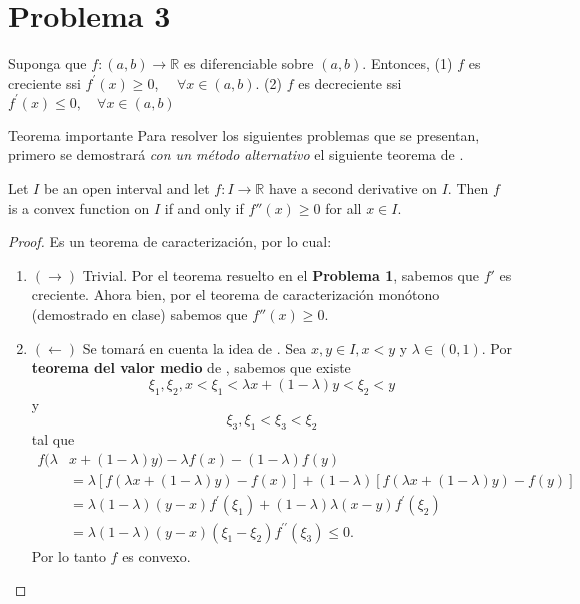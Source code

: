 \section{Problema 3}
\begin{tcolorbox}[colback=gray!15,colframe=gray!1!gray,title=Teorema caracterización monótono (demostrado en clase)]
	Suponga que $f:(a, b) \rightarrow \mathbb{R}$ es diferenciable sobre $(a, b)$. Entonces,\newline
	(1) $f$ es creciente ssi $f^{\prime}(x) \geqslant 0$, $\quad  \forall x \in(a, b)$.\newline
	(2) $f$ es decreciente ssi $f^{\prime}(x) \leqslant 0, \quad \forall x \in(a, b)$
\end{tcolorbox}
\begin{noter}{Teorema importante}
	Para resolver los siguientes problemas que se presentan, primero se demostrará \textit{con un método alternativo} el siguiente teorema de \cite{bartle2000introduction}. 
	\begin{tcolorbox}[colback=gray!15,colframe=gray!1!gray,title=Teorema  6.4.6]
		Let $I$ be an open interval and let $f : I \to \mathbb{R}$ have a second derivative on $I$. Then $f$ is a convex function on $I$ if and only if $f''(x)\geq 0$ for all $x \in I$.
	\end{tcolorbox}


\begin{proof}
	Es un teorema de caracterización, por lo cual: 
	\begin{enumerate}
		\item $(\to)$ Trivial. Por el teorema resuelto en el \textbf{Problema 1}, sabemos que $f'$ es creciente. Ahora bien, por el teorema de caracterización monótono (demostrado en clase) sabemos que $f''(x)\geq 0$. 
		\item $(\gets)$ Se tomará en cuenta la idea de \cite{tiel1984convex}. 
		Sea $x, y \in I, x<y$ y $\lambda\in (0,1)$. Por \textbf{teorema del valor medio} de \cite{bartle2000introduction}, sabemos que existe\newline $$\xi_{1}, \xi_{2}, x<\xi_{1}<\lambda x+(1-\lambda) y<\xi_{2}<y$$y  $$\xi_{3}, \xi_{1}<\xi_{3}<\xi_{2}$$
		tal que
		$$
		\begin{aligned}
			f(\lambda&x+(1-\lambda) y)-\lambda f(x)-(1-\lambda) f(y) \\
			&=\lambda[f(\lambda x+(1-\lambda) y)-f(x)]+(1-\lambda)[f(\lambda x+(1-\lambda) y)-f(y)] \\
			&=\lambda(1-\lambda)(y-x) f^{\prime}\left(\xi_{1}\right)+(1-\lambda) \lambda(x-y) f^{\prime}\left(\xi_{2}\right) \\
			&=\lambda(1-\lambda)(y-x)\left(\xi_{1}-\xi_{2}\right) f^{\prime \prime}\left(\xi_{3}\right) \leqslant 0 .
		\end{aligned}
		$$
		Por lo tanto $f$ es convexo.
	\end{enumerate}
\end{proof}
\end{noter}
